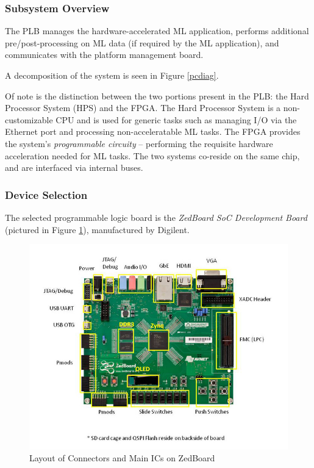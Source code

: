 \subsubsection{Subsystem Overview}
 The PLB manages the hardware-accelerated ML application, performs additional pre/post-processing on ML data (if required by the ML application), and communicates with the platform management board.

A decomposition of the system is seen in Figure \ref{pcdiag}.

Of note is the distinction between the two portions present in the PLB: the Hard Processor System (HPS) and the FPGA. The Hard Processor System is a non-customizable CPU and is used for generic tasks such as managing I/O via the Ethernet port and processing non-acceleratable ML tasks. The FPGA provides the system's \textit{programmable circuity} -- performing the requisite hardware acceleration needed for ML tasks. The two systems co-reside on the same chip, and are interfaced via internal buses.

\subsubsection{Device Selection}
The selected programmable logic board is the \textit{ZedBoard SoC Development Board} (pictured in Figure \ref{zedboard}), manufactured by Digilent. 

\begin{figure}
\centering
\includegraphics[width=12.5cm]{img/zedboard_functional_overview.jpg}
\caption[Layout of Connectors and Main ICs on ZedBoard]{Layout of Connectors and Main ICs on ZedBoard \cite{zedboard}}
\label{zedboard}
\end{figure}

